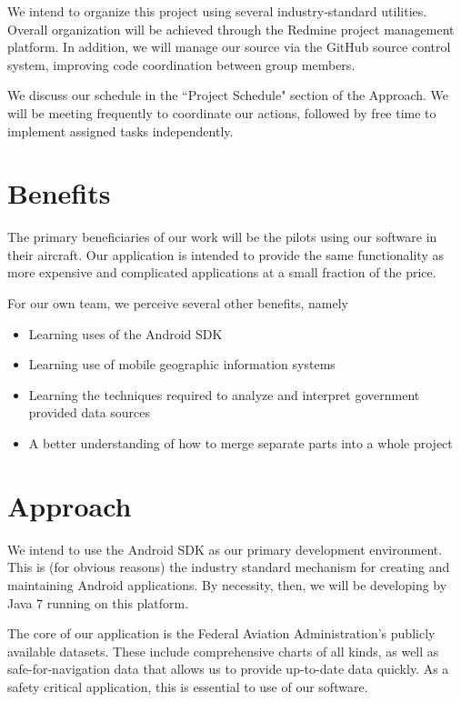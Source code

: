 \documentclass[10pt,a4paper]{article}
\begin{document}
We intend to organize this project using several industry-standard utilities. Overall organization will be achieved through the Redmine project management platform. In addition, we will manage our source via the GitHub source control system, improving code coordination between group members. 

We discuss our schedule in the ``Project Schedule" section of the Approach. We will be meeting frequently to coordinate our actions, followed by free time to implement assigned tasks independently.
\section{Benefits}
The primary beneficiaries of our work will be the pilots using our software in their aircraft. Our application is intended to provide the same functionality as more expensive and complicated applications at a small fraction of the price.

For our own team, we perceive several other benefits, namely
\begin{itemize}
\item Learning uses of the Android SDK
\item Learning use of mobile geographic information systems
\item Learning the techniques required to analyze and interpret government provided data sources
\item A better understanding of how to merge separate parts into a whole project
\end{itemize}

\section{Approach}
We intend to use the Android SDK as our primary development environment. This is (for obvious reasons) the industry standard mechanism for creating and maintaining Android applications. By necessity, then, we will be developing by Java 7 running on this platform. 

The core of our application is the Federal Aviation Administration's publicly available datasets. These include comprehensive charts of all kinds, as well as safe-for-navigation data that allows us to provide up-to-date data quickly. As a safety critical application, this is essential to use of our software.
\end{document}
